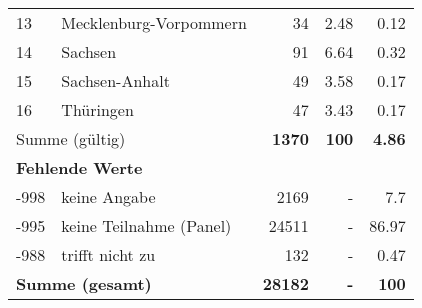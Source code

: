 \begin{longtable}{lXrrr}
     13 &
     \multicolumn{1}{X}{ Mecklenburg-Vorpommern   } &


       \num{34} &
       \num[round-mode=places,round-precision=2]{2,48} &
         \num[round-mode=places,round-precision=2]{0,12} \\

     14 &
     \multicolumn{1}{X}{ Sachsen   } &


       \num{91} &
       \num[round-mode=places,round-precision=2]{6,64} &
         \num[round-mode=places,round-precision=2]{0,32} \\

     15 &
     \multicolumn{1}{X}{ Sachsen-Anhalt   } &


       \num{49} &
       \num[round-mode=places,round-precision=2]{3,58} &
         \num[round-mode=places,round-precision=2]{0,17} \\

     16 &
     \multicolumn{1}{X}{ Thüringen   } &


       \num{47} &
       \num[round-mode=places,round-precision=2]{3,43} &
         \num[round-mode=places,round-precision=2]{0,17} \\
     \midrule
     \multicolumn{2}{l}{Summe (gültig)} &
       \textbf{\num{1370}} &
     \textbf{100} &
       \textbf{\num[round-mode=places,round-precision=2]{4,86}} \\
     \multicolumn{5}{l}{\textbf{Fehlende Werte}}\\
       -998 &
       keine Angabe &
         \num{2169} &
        - &
         \num[round-mode=places,round-precision=2]{7,7} \\
       -995 &
       keine Teilnahme (Panel) &
         \num{24511} &
        - &
         \num[round-mode=places,round-precision=2]{86,97} \\
       -988 &
       trifft nicht zu &
         \num{132} &
        - &
         \num[round-mode=places,round-precision=2]{0,47} \\
     \midrule
     \multicolumn{2}{l}{\textbf{Summe (gesamt)}} &
          \textbf{\num{28182}} &
        \textbf{-} &
        \textbf{100} \\
     \bottomrule
     \end{longtable}
     
